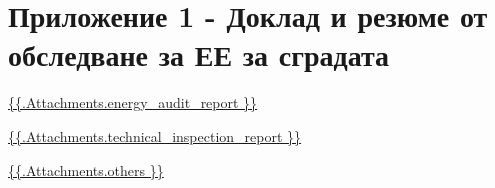 \section{Приложение 1 {-} Доклад и резюме от обследване за ЕЕ за сградата}

\url{ {{.Attachments.energy_audit_report }} }

\iffalse attachment value="energy audit report" \fi

\url{ {{.Attachments.technical_inspection_report }} }

\iffalse attachment value="technical inspection report" \fi

          \url{ {{.Attachments.others }} }
          \iffalse attachment value="others" \fi
